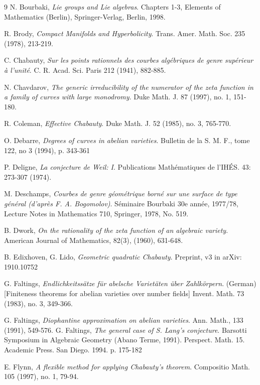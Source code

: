 \documentclass[11pt]{amsart}
\theoremstyle{remark}
\numberwithin{equation}{section}
\begin{document}
\begin{thebibliography}{9}
 N. Bourbaki, \emph{Lie groups and Lie algebras}. Chapters 1-3, Elements of Mathematics (Berlin), Springer-Verlag, Berlin, 1998.

 R. Brody, \emph{Compact Manifolds and Hyperbolicity}. Trans. Amer. Math. Soc. 235 (1978), 213-219.

 C. Chabauty, \emph{Sur les points rationnels des courbes alg\'ebriques de genre sup\'erieur \`a l'unit\'e}. C. R. Acad. Sci. Paris 212 (1941), 882-885.

 N. Chavdarov, \emph{The generic irreducibility of the numerator of the zeta function in a family of curves with large monodromy}. Duke Math. J. 87 (1997), no. 1, 151-180.


 R. Coleman, \emph{Effective Chabauty}. Duke Math. J. 52 (1985), no. 3, 765-770.

 O. Debarre, \emph{Degrees of curves in abelian varieties}. Bulletin de la S. M. F., tome 122, no 3 (1994), p. 343-361

 P. Deligne, \emph{La conjecture de Weil: I}. Publications Math\'ematiques de l'IH\'ES. 43: 273-307 (1974).

 M. Deschamps, \emph{Courbes de genre g\'eom\'etrique born\'e sur une surface de type g\'en\'eral (d'apr\`es F. A. Bogomolov)}. S\'eminaire Bourbaki 30e ann\'ee, 1977/78, Lecture Notes in Mathematics 710, Springer, 1978, No. 519.


 B. Dwork, \emph{On the rationality of the zeta function of an algebraic variety}. American Journal of Mathematics, 82(3), (1960), 631-648.


 B. Edixhoven, G. Lido, \emph{Geometric quadratic Chabauty}. Preprint, v3 in arXiv: 1910.10752

 G. Faltings, \emph{Endlichkeitss\"atze f\"ur abelsche Variet\"aten \"uber Zahlk\"orpern}. (German) [Finiteness theorems for abelian varieties over number fields] Invent. Math. 73 (1983), no. 3, 349-366.

 G. Faltings, \emph{Diophantine approximation on abelian varieties}. Ann. Math., 133 (1991), 549-576.
%
 G. Faltings, \emph{The general case of S. Lang's conjecture}. Barsotti Symposium in Algebraic Geometry (Abano Terme, 1991). Perspect. Math. 15. Academic Press. San Diego. 1994. p. 175-182


 E. Flynn, \emph{A flexible method for applying Chabauty's theorem}. Compositio Math. 105 (1997), no. 1, 79-94.




\end{thebibliography}
\end{document}

